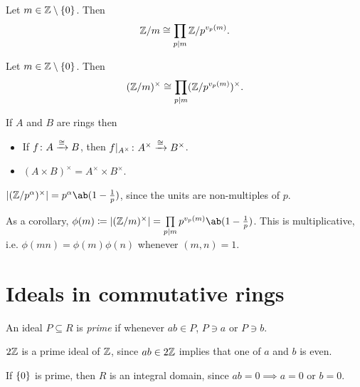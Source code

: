 \begin{corollary}
    Let $m \in \mathbb{Z} \setminus \{0\}$.
    Then \[
        \mathbb{Z}/m \cong \prod_{p \mid m} \mathbb{Z}/p^{v_p(m)}.
    \]
\end{corollary}

\begin{corollary}
    Let $m \in \mathbb{Z} \setminus \{0\}$.
    Then \[
        (\mathbb{Z}/m)^\times \cong \prod_{p \mid m} (\mathbb{Z}/p^{v_p(m)})^\times.
    \]
\end{corollary}
\begin{remarks}
    \item If $A$ and $B$ are rings then
        \begin{itemize}
            \item If $f\colon A \xrightarrow{\cong} B$,
                then $f\vert_{A^\times}\colon A^\times \xrightarrow{\cong} B^\times$.
            \item $(A \times B)^\times = A^\times \times B^\times$.
        \end{itemize}
    \item $\abs{(\Z/p^\alpha)^\times} = p^\alpha \ab(1 - \frac1p)$,
        since the units are non-multiples of $p$.
    \item As a corollary, $\phi(m) \coloneq \abs{(\Z/m)^\times}
        = \prod\limits_{p \mid m} p^{v_p(m)} \ab(1 - \frac1p)$.
        This is multiplicative, i.e. $\phi(mn) = \phi(m) \phi(n)$ whenever
        $(m, n) = 1$.
\end{remarks}

\section{Ideals in commutative rings} \label{sec:comm-ideals}
\begin{definition*}[prime] \label{def:comm-ideals:prime}
    An ideal $P \subseteq R$ is \emph{prime} if whenever $ab \in P$,
    $P \ni a$ or $P \ni b$.
\end{definition*}
\begin{examples}
    \item $2\mathbb{Z}$ is a prime ideal of $\mathbb{Z}$, since $ab \in 2\mathbb{Z}$ implies that
        one of $a$ and $b$ is even.
    \item If $\{0\}$ is prime, then $R$ is an integral domain, since
        $ab = 0 \implies a = 0$ or $b = 0$.
\end{examples}

